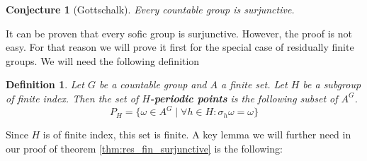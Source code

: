 \documentclass[titlepage, a4paper]{article}
\newtheorem{definition}[theorem]{Definition}
\newtheorem{conjecture}[theorem]{Conjecture}
\theoremstyle{remark}
\begin{document}
    \begin{conjecture}[Gottschalk] \label{conj:gottschalk}
        Every countable group is surjunctive.
    \end{conjecture}

    It can be proven that every sofic group is surjunctive. However, the proof is not easy. For that reason we will prove it first for the special case of residually finite groups. We will need the following definition

    \begin{definition}
	    Let $G$ be a countable group and $A$ a finite set. Let $H$ be a subgroup of finite index. Then the set of \textbf{$H$-periodic points} is the following subset of $A^G$.
        \[
        P_H = \{ \omega \in A^G  \mid \forall h \in H: \sigma_h\omega = \omega\}
        \]
    \end{definition}

    Since $H$ is of finite index, this set is finite. 
    A key lemma we will further need in our proof of theorem \ref{thm:res_fin_surjunctive} is the following:
\end{document}
